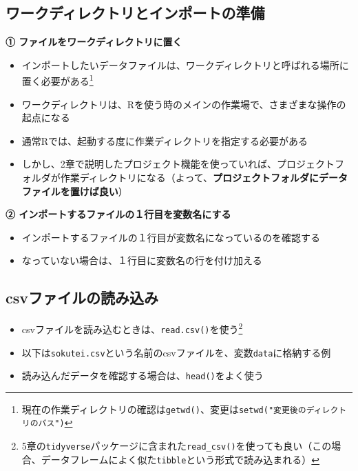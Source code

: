 \documentclass[
]{book}
\providecommand{\tightlist}{%
  \setlength{\itemsep}{0pt}\setlength{\parskip}{0pt}}
\begin{document}
\hypertarget{ux30efux30fcux30afux30c7ux30a3ux30ecux30afux30c8ux30eaux3068ux30a4ux30f3ux30ddux30fcux30c8ux306eux6e96ux5099}{%
\subsection{ワークディレクトリとインポートの準備}\label{ux30efux30fcux30afux30c7ux30a3ux30ecux30afux30c8ux30eaux3068ux30a4ux30f3ux30ddux30fcux30c8ux306eux6e96ux5099}}

\textbf{① ファイルをワークディレクトリに置く}

\begin{itemize}
\tightlist
\item
  インポートしたいデータファイルは、ワークディレクトリと呼ばれる場所に置く必要がある\footnote{現在の作業ディレクトリの確認は\texttt{getwd()}、変更は\texttt{setwd("変更後のディレクトリのパス")}}
\item
  ワークディレクトリは、Rを使う時のメインの作業場で、さまざまな操作の起点になる
\item
  通常Rでは、起動する度に作業ディレクトリを指定する必要がある
\item
  しかし、2章で説明したプロジェクト機能を使っていれば、プロジェクトフォルダが作業ディレクトリになる（よって、\textbf{プロジェクトフォルダにデータファイルを置けば良い}）
\end{itemize}

\textbf{② インポートするファイルの１行目を変数名にする}

\begin{itemize}
\tightlist
\item
  インポートするファイルの１行目が変数名になっているのを確認する
\item
  なっていない場合は、１行目に変数名の行を付け加える
\end{itemize}

\hypertarget{csvux30d5ux30a1ux30a4ux30ebux306eux8aadux307fux8fbcux307f}{%
\subsection{csvファイルの読み込み}\label{csvux30d5ux30a1ux30a4ux30ebux306eux8aadux307fux8fbcux307f}}

\begin{itemize}
\tightlist
\item
  csvファイルを読み込むときは、\texttt{read.csv()}を使う\footnote{5章の\texttt{tidyverse}パッケージに含まれた\texttt{read\_csv()}を使っても良い（この場合、データフレームによく似た\texttt{tibble}という形式で読み込まれる）}
\item
  以下は\texttt{sokutei.csv}という名前のcsvファイルを、変数\texttt{data}に格納する例
\item
  読み込んだデータを確認する場合は、\texttt{head()}をよく使う
\end{itemize}
\end{document}
